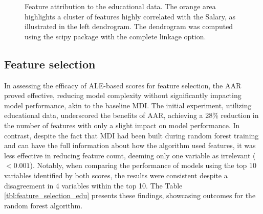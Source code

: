 \begin{figure}[H]
\centering
  \caption{Feature attribution to the educational data. The orange area highlights a cluster of features highly correlated with the Salary, as illustrated in the left dendrogram. The dendrogram was computed using the scipy package with the complete linkage option.}
  \label{fig:edu_data}
\end{figure}



\subsection{Feature selection}

In assessing the efficacy of \gls{ALE}-based scores for feature selection, the \gls{AAR} proved effective, reducing model complexity without significantly impacting model performance, akin to the baseline \gls{MDI}. The initial experiment, utilizing educational data, underscored the benefits of \gls{AAR}, achieving a 28\% reduction in the number of features with only a slight impact on model performance. In contrast, despite the fact that \gls{MDI} had been built during random forest training and can have the full information about how the algorithm used features, it was less effective in reducing feature count, deeming only one variable as irrelevant (\(< 0.001\)). Notably, when comparing the performance of models using the top 10 variables identified by both scores, the results were consistent despite a disagreement in 4 variables within the top 10. The Table \ref{tbl:feature_selection_edu} presents these findings, showcasing outcomes for the random forest algorithm.

